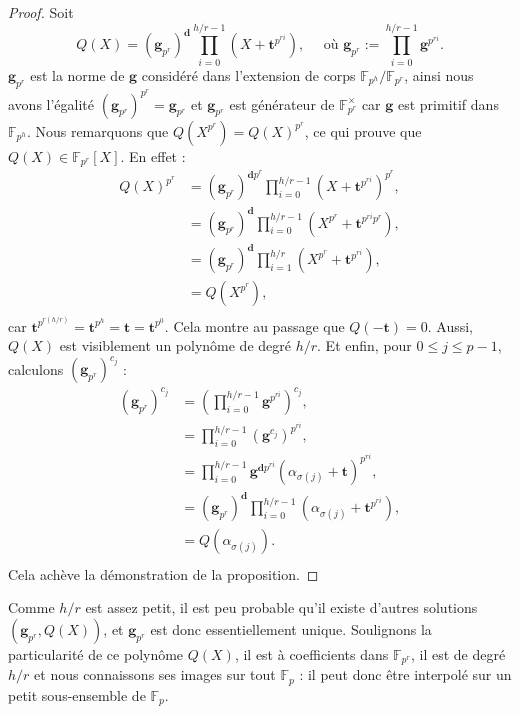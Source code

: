 \documentclass[a4paper, titlepage, 11pt]{article}
\theoremstyle{definition}
\theoremstyle{remark}
\def\gf #1{\mathbb{F}_{#1}}
\def\mbf #1{\mathbf{#1}}
\newcommand{\extension}[2]{{#1} / {#2}} %
\begin{document}
\begin{proof}
Soit
$$Q(X) = (\mbf g_{p^r})^{\mbf d} \prod_{i=0}^{h/r-1} \left(X+\mbf t^{p^{ri}}\right),
\quad \text{ où } \mbf g_{p^r} := \prod_{i=0}^{h/r-1} \mbf g^{p^{ri}}.$$
$\mbf g_{p^r}$ est la norme de $\mbf g$ considéré dans l'extension de corps $\extension{\gf{p^h}}{\gf{p^r}}$, ainsi nous avons l'égalité $(\mbf g_{p^r})^{p^r} = \mbf g_{p^r}$ et $\mbf g_{p^r}$ est générateur de $\gf{p^r}^\times$ car $\mbf g$ est primitif dans $\gf{p^h}$. Nous remarquons que $Q\left(X^{p^r}\right) = Q(X)^{p^r}$, ce qui prouve que $Q(X) \in \gf{p^r}[X]$. En effet :
\begin{align*}
Q\left(X\right)^{p^r} &= (\mbf g_{p^r})^{\mbf dp^r} \prod_{i=0}^{h/r-1} \left(X+\mbf t^{p^{ri}}\right)^{p^r}, \\
&= (\mbf g_{p^r})^{\mbf d} \prod_{i=0}^{h/r-1} \left(X^{p^r} + \mbf t^{p^{ri}p^r}\right), \\
&= (\mbf g_{p^r})^{\mbf d} \prod_{i=1}^{h/r} \left(X^{p^r} + \mbf t^{p^{ri}}\right), \\
&= Q\left(X^{p^r}\right), \\
\end{align*}
car $\mbf t^{p^{r(h/r)}} = \mbf t^{p^h} = \mbf t = \mbf t^{p^0}$. Cela montre au passage que $Q(-\mbf t) = 0$. Aussi, $Q(X)$ est visiblement un polynôme de degré $h/r$. Et enfin, pour $0\leqslant j \leqslant p-1$, calculons $(\mbf g_{p^r})^{c_j}$ :
\begin{align*}
(\mbf g_{p^r})^{c_j} &= \left(\prod_{i=0}^{h/r-1} \mbf g^{p^{ri}}\right)^{c_j},\\
&= \prod_{i=0}^{h/r-1} \left(\mbf g^{c_j}\right)^{p^{ri}}, \\
&= \prod_{i=0}^{h/r-1} \mbf g^{\mbf dp^{ri}}\left(\alpha_{\sigma(j)} + \mbf t\right)^{p^{ri}},\\
&= (\mbf g_{p^r})^{\mbf d} \prod_{i=0}^{h/r-1} \left(\alpha_{\sigma(j)} + \mbf t^{p^{ri}}\right),\\
&= Q\left(\alpha_{\sigma(j)}\right). \\
\end{align*}
Cela achève la démonstration de la proposition.
\end{proof}

Comme $h/r$ est assez petit, il est peu probable qu'il existe d'autres solutions $(\mbf g_{p^r}, Q(X))$, et $\mbf g_{p^r}$ est donc essentiellement unique. Soulignons la particularité de ce polynôme $Q(X)$, il est à coefficients dans $\gf{p^r}$, il est de degré $h/r$ et nous connaissons ses images sur tout $\gf{p}$ : il peut donc être interpolé sur un petit sous-ensemble de $\gf{p}$.
\end{document}
